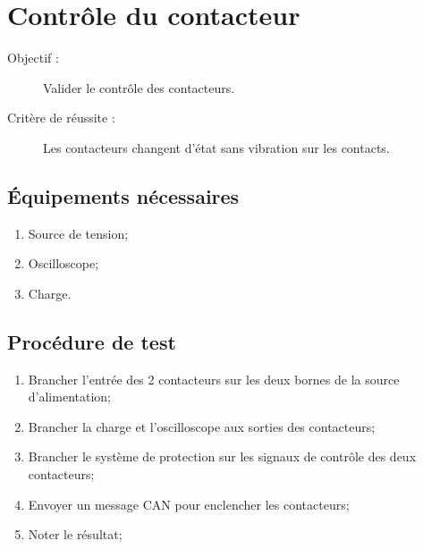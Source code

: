 
\section{Contrôle du contacteur}

	\begin{description}
		\item[Objectif :] Valider le contrôle des contacteurs.
		\item[Critère de réussite :] Les contacteurs changent d'état sans vibration sur les contacts.
	\end{description}
	
	\subsection*{Équipements nécessaires}
	\begin{enumerate}
		\item Source de tension;
		\item Oscilloscope;
		\item Charge.
	\end{enumerate}	
	
	\subsection*{Procédure de test}
	\begin{enumerate}
		\item Brancher l'entrée des 2 contacteurs sur les deux bornes de la source d'alimentation;
		\item Brancher la charge et l'oscilloscope aux sorties des contacteurs;
		\item Brancher le système de protection sur les signaux de contrôle des deux contacteurs;
		\item Envoyer un message CAN pour enclencher les contacteurs;
		\item Noter le résultat;
	\end{enumerate}